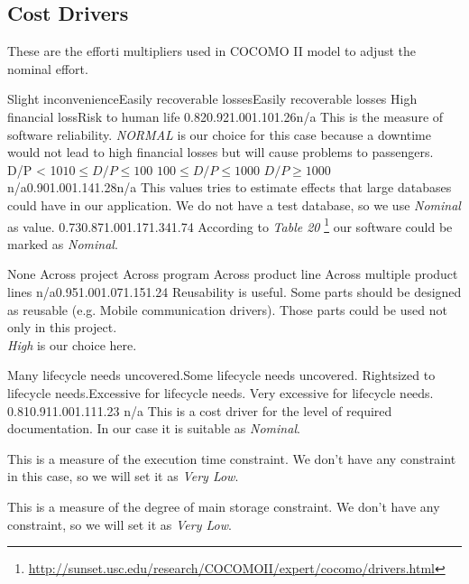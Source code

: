 \pagebreak
\subsection{Cost Drivers} %
These are the efforti multipliers used in COCOMO II model to adjust the
nominal effort. 
\label{sub:cost_drivers}

{Slight inconvenience}{Easily recoverable losses}{Easily recoverable losses}
{High financial loss}{Risk to human life}{}
{0.82}{0.92}{1.00}{1.10}{1.26}{n/a} {
    This is the measure of software reliability. \emph{NORMAL} is our choice
    for this case because a downtime would not lead to high financial losses
    but will cause problems to passengers.
}
{ }{D/P < 10}{$ 10 \leq D/P \le 100 $}{ $ 100 \leq D/P \le 1000 $} { $ D/P \ge 1000 $ } { }
{n/a}{0.90}{1.00}{1.14}{1.28}{n/a}
{This values tries to estimate effects that large databases could have in our application.
    We do not have a test database, so we use \emph{Nominal} as value.
}
 { 0.73}{0.87}{1.00}{1.17}{1.34}{1.74} { 
    According to \emph{Table 20} 
    \footnote{ \url{http://sunset.usc.edu/research/COCOMOII/expert/cocomo/drivers.html} }
    our software could be marked as \emph{Nominal}.
}

{ } { None } { Across project } { Across program } { Across product line} 
{Across multiple product lines} { n/a}{0.95}{1.00}{1.07}{1.15}{1.24} {
    Reusability is useful. Some parts should be designed as reusable (e.g.
    Mobile communication drivers). Those parts could be used not only in this project. \\
    \emph{High} is our choice here.
}

{Many life\-cycle needs uncovered.}{Some life\-cycle needs uncovered.}
{Right\-sized to life\-cycle needs.}{Excessive for life\-cycle needs.}
{Very excessive for life\-cycle needs.}{ } 
{0.81}{0.91}{1.00}{1.11}{1.23}{ n/a } { 
    This is a cost driver for the level of required documentation. 
    In our case it is suitable as \emph{Nominal}.
}

\pagebreak

 {
    This is a measure of the execution time constraint. We don't have any
    constraint in this case, so we will set it as \emph{Very Low}.
}

 {
    This is a measure of the degree of main storage constraint. 
    We don't have any constraint, so we will set it as \emph{Very Low}.
}

